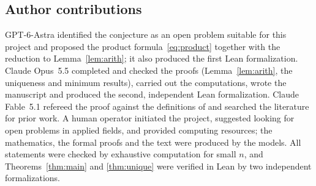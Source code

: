 \documentclass[11pt]{amsart}
\theoremstyle{definition}
\theoremstyle{remark}
\begin{document}
\subsection*{Author contributions}
GPT-6-Astra identified the conjecture as an open problem suitable for this project and proposed the product formula~\eqref{eq:product} together with the reduction to Lemma~\ref{lem:arith}; it also produced the first Lean formalization.
Claude Opus~5.5 completed and checked the proofs (Lemma~\ref{lem:arith}, the uniqueness and minimum results), carried out the computations, wrote the manuscript and produced the second, independent Lean formalization.
Claude Fable~5.1 refereed the proof against the definitions of \cite{DR2019} and searched the literature for prior work.
A human operator initiated the project, suggested looking for open problems in applied fields, and provided computing resources; the mathematics, the formal proofs and the text were produced by the models.
All statements were checked by exhaustive computation for small $n$, and Theorems~\ref{thm:main} and \ref{thm:unique} were verified in Lean by two independent formalizations.
\end{document}
